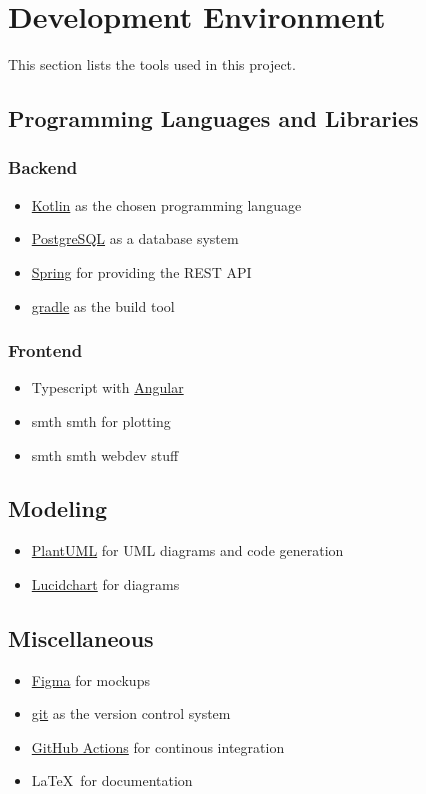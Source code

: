 \section{Development Environment}

This section lists the tools used in this project.

\subsection{Programming Languages and Libraries}

\subsubsection*{Backend}
\begin{itemize}
    \item \href{https://kotlinlang.org/}{Kotlin} as the chosen programming language
    \item \href{https://www.postgresql.org/}{PostgreSQL} as a database system
    \item \href{https://spring.io/}{Spring} for providing the \gls{REST API}
    \item \href{https://gradle.org/}{gradle} as the build tool
\end{itemize}

\subsubsection*{Frontend}
\begin{itemize}
    \item Typescript with \href{https://angular.io/}{Angular}
    \item smth smth for plotting
    \item smth smth webdev stuff
\end{itemize}

\subsection{Modeling}
\begin{itemize}
    \item \href{https://plantuml.com/}{PlantUML} for UML diagrams and code generation
    \item \href{https://www.lucidchart.com/}{Lucidchart} for diagrams
\end{itemize}

\subsection{Miscellaneous}
\begin{itemize}
    \item \href{https://www.figma.com/}{Figma} for mockups
    \item \href{https://git-scm.com/}{git} as the version control system
    \item \href{https://github.com/features/actions}{GitHub Actions} for continous integration
    \item \LaTeX \ for documentation
\end{itemize}
